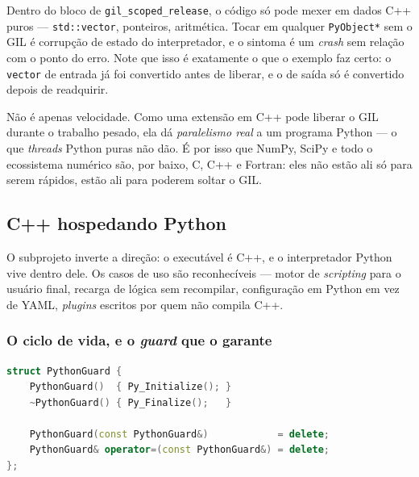 \begin{regra}
Dentro do bloco de \texttt{gil\_scoped\_release}, o código só pode mexer em
dados C++ puros --- \texttt{std::vector}, ponteiros, aritmética. Tocar em
qualquer \texttt{PyObject*} sem o GIL é corrupção de estado do interpretador, e
o sintoma é um \emph{crash} sem relação com o ponto do erro. Note que isso é
exatamente o que o exemplo faz certo: o \texttt{vector} de entrada já foi
convertido antes de liberar, e o de saída só é convertido depois de readquirir.
\end{regra}

\begin{porque}
Não é apenas velocidade. Como uma extensão em C++ pode liberar o GIL durante o
trabalho pesado, ela dá \emph{paralelismo real} a um programa Python --- o que
\emph{threads} Python puras não dão. É por isso que NumPy, SciPy e todo o
ecossistema numérico são, por baixo, C, C++ e Fortran: eles não estão ali só
para serem rápidos, estão ali para poderem soltar o GIL.
\end{porque}

\subsection{C++ hospedando Python}
\label{sec:embed-python}

O subprojeto  inverte a direção: o executável é C++, e o
interpretador Python vive dentro dele. Os casos de uso são reconhecíveis ---
motor de \emph{scripting} para o usuário final, recarga de lógica sem
recompilar, configuração em Python em vez de YAML, \emph{plugins} escritos por
quem não compila C++.

\subsubsection{O ciclo de vida, e o \emph{guard} que o garante}

\begin{lstlisting}[style=bt, language=C++,
    caption={A mesma técnica do \texttt{ThreadGuard} e do
             \texttt{RedirectGuard}, aplicada ao interpretador.}]
struct PythonGuard {
    PythonGuard()  { Py_Initialize(); }
    ~PythonGuard() { Py_Finalize();   }

    PythonGuard(const PythonGuard&)            = delete;
    PythonGuard& operator=(const PythonGuard&) = delete;
};
\end{lstlisting}

